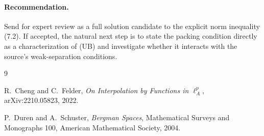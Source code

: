 \documentclass[11pt]{article}
\begin{document}
\paragraph{Recommendation.}
Send for expert review as a full solution candidate to the explicit norm
inequality (7.2).  If accepted, the natural next step is to state the packing
condition directly as a characterization of (UB) and investigate whether it
interacts with the source's weak-separation conditions.

\begin{thebibliography}{9}

R.~Cheng and C.~Felder,
\emph{On Interpolation by Functions in $\ell_A^p$},
arXiv:2210.05823, 2022.

P.~Duren and A.~Schuster,
\emph{Bergman Spaces},
Mathematical Surveys and Monographs 100, American Mathematical Society, 2004.

\end{thebibliography}
\end{document}
